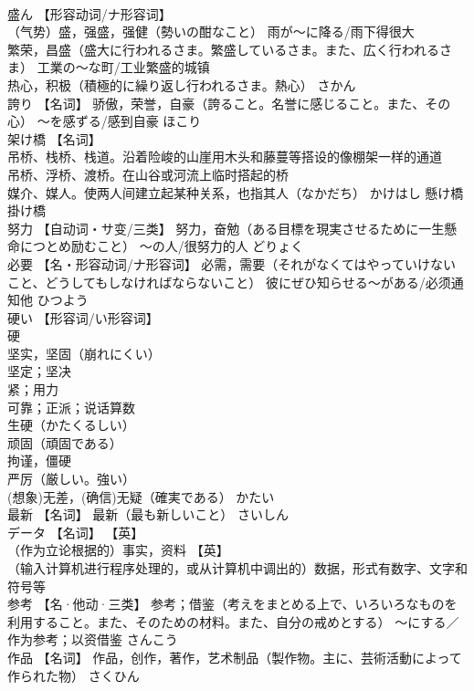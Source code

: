 \documentclass[8pt]{extreport}
\begin{document}
\begin{CJK}{UTF8}{min}
\\	盛ん	【形容动词/ナ形容词】 
\\	（气势）盛，强盛，强健（勢いの酣なこと） 雨が～に降る/雨下得很大 
\\	繁荣，昌盛（盛大に行われるさま。繁盛しているさま。また、広く行われるさま） 工業の～な町/工业繁盛的城镇 
\\	热心，积极（積極的に繰り返し行われるさま。熱心）	さかん	
\\	誇り	【名词】 骄傲，荣誉，自豪（誇ること。名誉に感じること。また、その心） ～を感ずる/感到自豪	ほこり	
\\	架け橋	【名词】 
\\	吊桥、栈桥、栈道。沿着险峻的山崖用木头和藤蔓等搭设的像棚架一样的通道 
\\	吊桥、浮桥、渡桥。在山谷或河流上临时搭起的桥 
\\	媒介、媒人。使两人间建立起某种关系，也指其人（なかだち）	かけはし	懸け橋 掛け橋
\\	努力	【自动词・サ变/三类】 努力，奋勉（ある目標を現実させるために一生懸命につとめ励むこと） ～の人/很努力的人	どりょく	
\\	必要	【名・形容动词/ナ形容词】 必需，需要（それがなくてはやっていけないこと、どうしてもしなければならないこと） 彼にぜひ知らせる～がある/必须通知他	ひつよう	
\\	硬い	【形容词/い形容词】 
\\	硬 
\\	坚实，坚固（崩れにくい） 
\\	坚定；坚决 
\\	紧；用力 
\\	可靠；正派；说话算数 
\\	生硬（かたくるしい） 
\\	顽固（頑固である） 
\\	拘谨，僵硬 
\\	严厉（厳しい。強い） 
\\	(想象)无差，(确信)无疑（確実である）	かたい	
\\	最新	【名词】 最新（最も新しいこと）	さいしん	
\\	データ	【名词】 【英】
\\	（作为立论根据的）事实，资料 【英】
\\	（输入计算机进行程序处理的，或从计算机中调出的）数据，形式有数字、文字和符号等		
\\	参考	【名·他动·三类】 参考；借鉴（考えをまとめる上で、いろいろなものを利用すること。また、そのための材料。また、自分の戒めとする） ～にする／作为参考；以资借鉴	さんこう	
\\	作品	【名词】 作品，创作，著作，艺术制品（製作物。主に、芸術活動によって作られた物）	さくひん	

\end{CJK}
\end{document}
